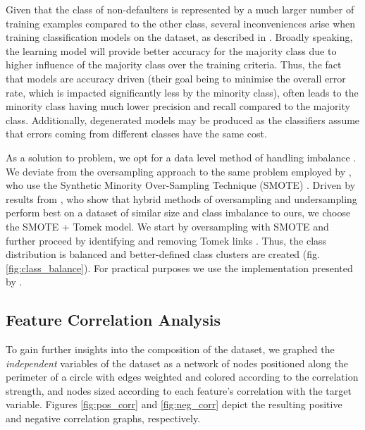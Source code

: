 \documentclass{article}
\begin{document}
Given that the class of non-defaulters is represented by a much larger number of training examples compared to the other class, several inconveniences arise when training classification models on the dataset, as described in \citet{ganganwar2012overview, weiss2004mining}. Broadly speaking, the learning model will provide better accuracy for the majority class due to higher influence of the majority class over the training criteria. Thus, the fact that models are accuracy driven (their goal being to minimise the overall error rate, which is impacted significantly less by the minority class), often leads to the minority class having much lower precision and recall compared to the majority class. Additionally, degenerated models may be produced as the classifiers assume that errors coming from different classes have the same cost.

As a solution to problem, we opt for a data level method of handling imbalance \cite{kotsiantis2006handling}. We deviate from the oversampling approach to the same problem employed by \citet{subasi2019prediction}, who use the Synthetic Minority Over-Sampling Technique (SMOTE) \cite{chawla2002smote}. Driven by results from \citet{batista2004study}, who show that hybrid methods of oversampling and undersampling perform best on a dataset of similar size and class imbalance to ours, we choose the SMOTE + Tomek model. We start by oversampling with SMOTE and further proceed by identifying and removing Tomek links \cite{tomek1976two}. Thus, the class distribution is balanced and better-defined class clusters are created (fig. \ref{fig:class_balance}). For practical purposes we use the implementation presented by \citet{lemaitre2017imbalanced}.

\subsection{Feature Correlation Analysis}
\label{sec:corr_analysis}

To gain further insights into the composition of the dataset, we graphed the \textit{independent} variables of the dataset as a network of nodes positioned along the perimeter of a circle with edges weighted and colored according to the correlation strength, and nodes sized according to each feature's correlation with the target variable. Figures \ref{fig:pos_corr} and \ref{fig:neg_corr} depict the resulting positive and negative correlation graphs, respectively.
\end{document}
